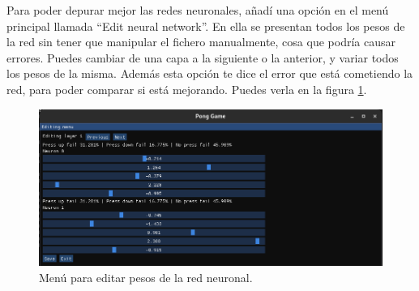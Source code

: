 Para poder depurar mejor las redes neuronales, añadí una opción en el menú principal llamada ``Edit neural network''. En ella se presentan todos los pesos de la red sin tener que manipular el fichero manualmente, cosa que podría causar errores. Puedes cambiar de una capa a la siguiente o la anterior, y variar todos los pesos de la misma. Además esta opción te dice el error que está cometiendo la red, para poder comparar si está mejorando. Puedes verla en la figura \ref{editar red neuronal}.

\begin{figure}[H]
	\centering
	\includegraphics[width=15cm]{archivos/imagenes/menu-editar-pesos-red.png}
	\caption{Menú para editar pesos de la red neuronal.}
	\label{editar red neuronal}
\end{figure}
